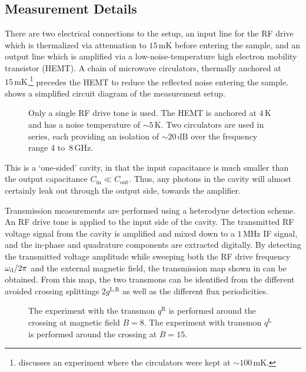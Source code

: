 \subsection{Measurement Details}\label{sec:measurement}
There are two electrical connections to the setup, an input line for the RF drive which is thermalized via attenuation to $15\,\text{mK}$ before entering the sample, and an output line which is amplified via a low-noise-temperature high electron mobility transistor (HEMT)\@.%
A chain of microwave circulators, thermally anchored at $15\,\text{mK}$,\footnote{ discusses an experiment where the circulators were kept at $\sim100\,\text{mK}$.} precedes the HEMT to reduce the reflected noise entering the sample.  shows a simplified circuit diagram of the measurement setup.
\begin{figure}
\centering
{}
\caption[Schematic of measurement setup]{ Only a single RF drive tone is used. The HEMT is anchored at $4\,\text{K}$ and has a noise temperature of $\mathord{\sim}5\,\text{K}$. Two circulators are used in series, each providing an isolation of $\mathord{\sim}20\, \text{dB}$ over the frequency range 4 to~8\,GHz.\label{schematic}}
\end{figure}%
This is a `one-sided' cavity, in that the input capacitance is much smaller than the output capacitance $C_\text{in}\ll C_\text{out}$. Thus, any photons in the cavity will almost certainly leak out through the output side, towards the amplifier.

Transmission measurements are performed using a heterodyne detection scheme. An RF drive tone is applied to the input side of the cavity. The transmitted RF voltage signal from the cavity is amplified and mixed down to a $1\,\text{MHz}$ IF signal, and the in-phase and quadrature components are extracted digitally. By detecting the transmitted voltage amplitude while sweeping both the RF drive frequency $\omega_{\text{d}}/2\pi$ and the external magnetic field, the transmission map shown in  can be obtained. From this map, the two transmons can be identified from the different avoided crossing splittings $2g^\text{L,R}$ as well as the different flux periodicities.
\begin{figure}
\centering
{}
\caption[Transmission versus magnetic field and drive frequency]
    { The experiment with the transmon $q^\text{R}$ is performed around the crossing at magnetic field $B = 8$. The experiment with transmon $q^\text{L}$ is performed around the crossing at $B = 15$.\label{fig:vrabimap}}
\end{figure}

